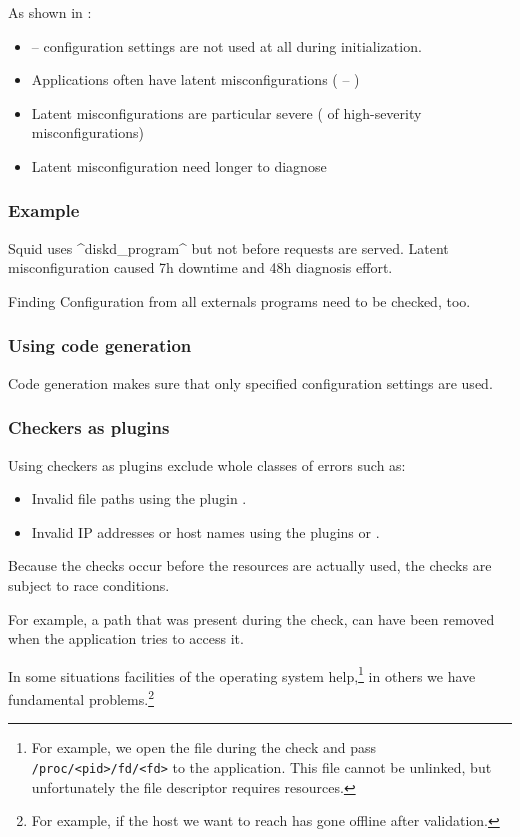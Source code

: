 \begin{frame}
	As shown in \cite{xu2016early}:
	\begin{itemize}[<+-| alert@+>]
	\item {} --  configuration settings are not used at all during initialization.
	\item Applications often have latent misconfigurations ( -- )
	\item Latent misconfigurations are particular severe ( of high-severity misconfigurations)
	\item Latent misconfiguration need longer to diagnose
	\end{itemize}
\end{frame}

\begin{frame}[fragile]
	\frametitle{Example~\cite{xu2016early}}

	Squid uses ^diskd_program^ but not before requests are served.
	Latent misconfiguration caused 7h downtime and 48h diagnosis effort.

	\pause

	\begin{alertblock}{Finding}
	Configuration from all externals programs need to be checked, too.
	\end{alertblock}
\end{frame}

\begin{frame}
	\frametitle{Using code generation}

	Code generation makes sure that only specified configuration settings are used.
\end{frame}

\begin{frame}
	\frametitle{Checkers as plugins}

	Using checkers as plugins exclude whole classes of errors such as:
	\begin{itemize}
	\item Invalid file paths using the plugin .
	\item Invalid IP addresses or host names using the plugins  or .
	\end{itemize}
	Because the checks occur before the resources are actually used, the checks are subject to race conditions.

	For example, a path that was present during the check, can have been removed when the application tries to access it.

	In some situations facilities of the operating system help,\footnote{For example, we open the file during the check and pass \texttt{/proc/<pid>/fd/<fd>} to the application. This file cannot be unlinked, but unfortunately the file descriptor requires resources.} in others we have fundamental problems.\footnote{For example, if the host we want to reach has gone offline after validation.}
\end{frame}


